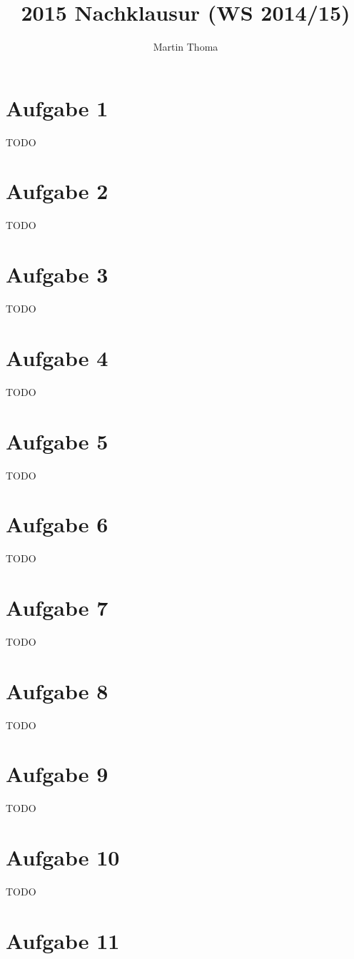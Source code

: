 \documentclass[a4paper]{scrartcl}
\begin{document}
\title{2015 Nachklausur (WS 2014/15)}
\author{Martin Thoma}

\setcounter{section}{1}
\section*{Aufgabe 1}
TODO

\section*{Aufgabe 2}
TODO

\section*{Aufgabe 3}
TODO

\section*{Aufgabe 4}
TODO

\section*{Aufgabe 5}
TODO

\section*{Aufgabe 6}
TODO

\section*{Aufgabe 7}
TODO

\section*{Aufgabe 8}
TODO

\section*{Aufgabe 9}
TODO

\section*{Aufgabe 10}
TODO

\section*{Aufgabe 11}
\inputminted[linenos, numbersep=5pt, tabsize=4, frame=lines, label=shader.frag]{glsl}{shader.frag}
\end{document}

